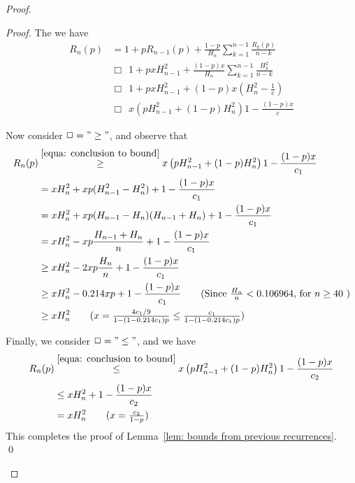 \documentclass[11pt]{llncs}
\begin{document}
\begin{proof}
\begin{proof}
The we have
\begin{align}
R_n(p) 
&
= 1+pR_{n-1}(p)+\frac{1-p}{H_n} \sum_{k=1}^{n-1} \frac{R_k(p)}{n-k} \tag{definition of $R_n$} \\
&
\Box~~ 1+p x H_{n-1}^2+\frac{(1-p)x}{H_n} \sum_{k=1}^{n-1} \frac{H_k^2}{n-k} \tag{Inductive Hypothesis} \\
&
\Box~~ 1+p x H_{n-1}^2+(1-p)x \left( H_n^2 - \frac1c \right) \tag{Preconditions} \\
&
\Box~~ 
x \left( pH_{n-1}^2 + (1-p) H_n^2 \right)
1 - \frac{(1-p)x}c \label{equa: conclusion to bound}
\end{align}

Now consider $\Box ="\geq"$, and observe that 
\begin{align}
R_n(p) 
&\stackrel{\eqref{equa: conclusion to bound}}{\geq}
x \left( pH_{n-1}^2 + (1-p) H_n^2 \right)
1 - \frac{(1-p)x}{c_1} \notag \\
& = x H_n^2 + xp(H_{n-1}^2 - H_n^2) + 1 - \frac{(1-p)x}{c_1} \notag \\
& = x H_n^2 + xp(H_{n-1} - H_n)(H_{n-1} + H_n) + 1 - \frac{(1-p)x}{c_1} \notag \\
& = x H_n^2 - xp \frac{H_{n-1} + H_n}{n} + 1 - \frac{(1-p)x}{c_1} \notag \\
& \geq x H_n^2 - 2xp \frac{H_n}{n} + 1 - \frac{(1-p)x}{c_1} \notag \\
& \geq x H_n^2 - 0.214 xp + 1 - \frac{(1-p)x}{c_1} \tag{Since $\frac{H_n}{n} < 0.106964$, for $n\geq 40$ } \\
& \geq x H_n^2 \tag{$x=\frac{4c_1/9}{1-(1-0.214c_1)p} \leq \frac{c_1}{1-(1-0.214c_1)p}$}
\end{align}

Finally, we consider $\Box ="\leq"$, and we have 
\begin{align}
R_n(p) 
&\stackrel{\eqref{equa: conclusion to bound}}{\leq}
x \left( pH_{n-1}^2 + (1-p) H_n^2 \right)
1 - \frac{(1-p)x}{c_2} \notag \\
& \leq x H_n^2 + 1 - \frac{(1-p)x}{c_2} \notag \\
& = x H_n^2 \tag{$x=\frac{c_2}{1-p}$}
\end{align}
This completes the proof of Lemma~\ref{lem: bounds from previous recurrences}.
\qed
\end{proof}



\end{proof}
\end{document}

